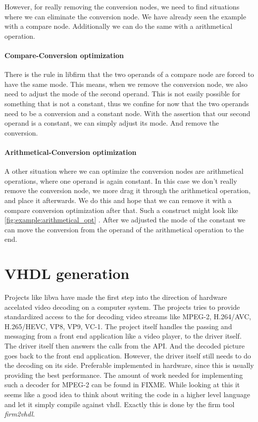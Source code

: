 However, for really removing the conversion nodes, we need to find situations where we can eliminate the conversion node. We have already seen the example with a compare node. Additionally we can do the same with a arithmetical operation.

\paragraph{Compare-Conversion optimization}
There is the rule in libfirm that the two operands of a compare node are forced to have the same mode. This means, when we remove the conversion node, we also need to adjust the mode of the second operand. This is not easily possible for something that is not a constant, thus we confine for now that the two operands need to be a conversion and a constant node.
With the assertion that our second operand is a constant, we can simply adjust its mode. And remove the conversion. 

\paragraph{Arithmetical-Conversion optimization}

A other situation where we can optimize the conversion nodes are arithmetical operations, where one operand is again constant. In this case we don't really remove the conversion node, we more drag it through the arithmetical operation, and place it afterwards. We do this and hope that we can remove it with a compare conversion optimization after that.
Such a construct might look like \autoref{fig:example:arithmetical_opt} . After we adjusted the mode of the constant we can move the conversion from the operand of the arithmetical operation to the end.
\section{VHDL generation}
Projects like libva have made the first step into the direction of hardware accelated video decoding on a computer system. The projects tries to provide standardized access to the for decoding video streams like MPEG-2, H.264/AVC, H.265/HEVC, VP8, VP9, VC-1. The project itself handles the passing and messaging from a front end application like a video player, to the driver itself. The driver itself then answers the calls from the API. And the decoded picture goes back to the front end application. However, the driver itself still needs to do the decoding on its side. Preferable implemented in hardware, since this is usually providing the best performance. The amount of work needed for implementing such a decoder for MPEG-2 can be found in FIXME. %
While looking at this it seems like a good idea to think about writing the code in a higher level language and let it simply compile against vhdl. Exactly this is done by the firm tool \textit{firm2vhdl}.
